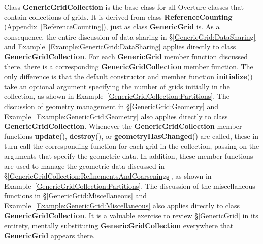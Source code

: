 \documentclass{article}
\begin{document}
Class \textbf{GenericGridCollection} is the base class for all Overture classes that contain collections of grids.  It is derived from
class \textbf{ReferenceCounting} (Appendix~\ref{ReferenceCounting}), just as class \textbf{GenericGrid} is.  As a consequence,
the entire discussion of data-sharing in \S\ref{GenericGrid:DataSharing} and Example~\ref{Example:GenericGrid:DataSharing} applies directly to
class \textbf{GenericGridCollection}.  For each \textbf{GenericGrid} member function discussed there, there is a corresponding
\textbf{GenericGridCollection} member function.  The only difference is that the default constructor and member function
\textbf{initialize}() take an optional argument specifying the number of grids initially in the collection, as shown in
Example~\ref{GenericGridCollection:Partitions}.  The discussion of geometry management in \S\ref{GenericGrid:Geometry} and
Example~\ref{Example:GenericGrid:Geometry} also applies directly to class \textbf{GenericGridCollection}.  Whenever the
\textbf{GenericGridCollection} member functions \textbf{update}(), \textbf{destroy}(), or
\textbf{geometryHasChanged}() are called, these in turn call the corresponding function for each grid in the collection, passing on the
arguments that specify the geometric data.  In addition, these member functions are used to manage the geometric data discussed in
\S\ref{GenericGridCollection:RefinementsAndCoarsenings}, as shown in Example~\ref{GenericGridCollection:Partitions}.  The discussion of the
miscellaneous functions in \S\ref{GenericGrid:Miscellaneous} and Example~\ref{Example:GenericGrid:Miscellaneous} also applies directly to class
\textbf{GenericGridCollection}.  It is a valuable exercise to review \S\ref{GenericGrid} in its entirety, mentally substituting
\textbf{GenericGridCollection} everywhere that \textbf{GenericGrid} appears there.
\end{document}

